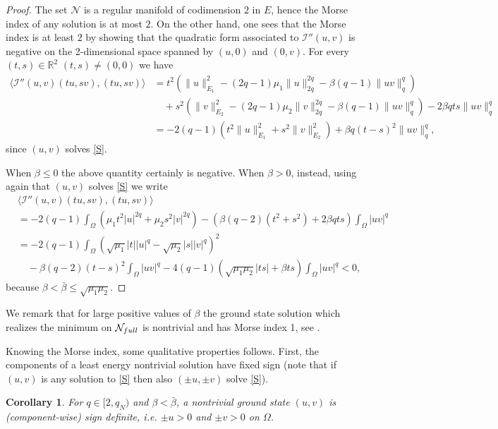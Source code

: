 \documentclass[10pt,a4paper]{amsart}
\numberwithin{equation}{section}
\newtheorem{corollary}[theo]{Corollary}
\begin{document}
\begin{proof}
The set $\mathcal N$ is a regular manifold of codimension $2$ in $E$, hence the Morse
index of any solution is at most $2$.
On the other hand, one sees that the Morse index is at least $2$ by showing that
the quadratic form associated to $\mathcal I''(u,v)$ is negative on the 2-dimensional
space spanned by $(u,0)$ and $(0,v)$.
 For every $(t,s)\in \mathbb{R}^2$ $(t,s)\neq(0,0)$ we have
\begin{align*}
 \langle \mathcal I''(u,v)  (tu,sv) , (tu, sv)\rangle
&= t^2 \left( \|u\|_{E_1}^2 -(2q\!-\!1)\mu_1 \|u\|_{2q}^{2q}
  - \beta (q\!-\!1)\|uv\|_q^q \right)  \\
&\quad + s^2\left( \|v\|_{E_2}^2 -(2q\!-\!1)\mu_2 \|v\|_{2q}^{2q}
  - \beta (q\!-\!1)\|uv\|_q^q \right)  - 2\beta q ts \|uv\|_q^{q}\\
& = -2(q-1) \left( t^2 \|u\|_{E_1}^2 + s^2 \|v\|_{E_2}^2\right)
 +\beta q (t-s)^2 \|uv\|_q^{q},
\end{align*}
 since $(u,v)$ solves \eqref{S}.

When $\beta\le 0$ the above quantity certainly is negative.
When $\beta>0$, instead, using again that $(u,v)$ solves \eqref{S} we write
\begin{align*}
&\langle \mathcal I''(u,v)  (tu,sv) , (tu, sv)\rangle \\
&= -2(q-1) \int_{\Omega}\left(\mu_1 t^2 |u|^{2q} + \mu_2 s^2|v|^{2q} \right)
 -\left(\beta (q-2) (t^2+s^2) +2\beta qts \right) \int_{\Omega}|uv|^q \\
&=  -2(q-1) \int_{\Omega}\left(\sqrt{\mu_1} |t| |u|^{q} - \sqrt{\mu_2} |s||v|^{q}
 \right)^2 \\
&\quad - \beta (q-2)(t-s)^2\int_{\Omega}|uv|^q
  - 4(q-1)\left(\sqrt{\mu_1\mu_2} |ts|+\beta ts \right) \int_{\Omega}|uv|^q
<0 ,
\end{align*}
because $\beta<\bar\beta\le \sqrt{\mu_1\mu_2}$.
\end{proof}

We remark that for large positive values of $\beta$ the ground state solution
which realizes the minimum on $\mathcal N_{\rm full}$ is nontrivial and has
Morse index 1, see \cite{MMP_JDE06}.

Knowing the Morse index, some qualitative properties follows.
First, the components of a least energy nontrivial solution  have fixed sign
(note that if $(u,v)$ is any solution to \eqref{S} then also $(\pm u, \pm v)$
solve \eqref{S}).

\begin{corollary}\label{cor:positive}
For $q\in [2,q_N)$ and $\beta <\bar\beta $, a  nontrivial ground state $(u,v)$
is (component-wise) sign definite, i.e. $\pm u>0$ and $\pm v>0$ on $\Omega$.
\end{corollary}
\end{document}
